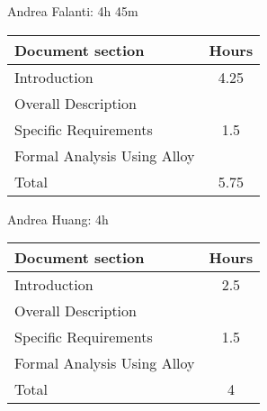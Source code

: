 Andrea Falanti: 4h 45m

\begin{tabular}{|l|c|}
    \hline
    Document section & Hours \\
    \hline
     Introduction & 4.25 \\
     Overall Description &  \\
     Specific Requirements & 1.5\\
     Formal Analysis Using Alloy & \\
     \hline
     Total & 5.75\\
     \hline
\end{tabular}
\vskip 0.3in

Andrea Huang: 4h

\begin{tabular}{|l|c|}
    \hline
    Document section & Hours \\
    \hline
     Introduction &  2.5\\
     Overall Description &  \\
     Specific Requirements & 1.5\\
     Formal Analysis Using Alloy & \\
     \hline
     Total & 4\\
     \hline
\end{tabular}